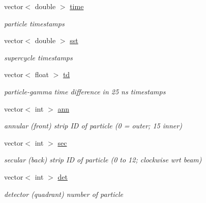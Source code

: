 \begin{DoxyCompactItemize}
\mbox{\label{classg__clx_a5c07b4406a965d58f0e89bb9da646e16}} 
vector$<$ double $>$ \hyperlink{classg__clx_a5c07b4406a965d58f0e89bb9da646e16}{time}
\begin{DoxyCompactList}\small\item\em particle timestamps \end{DoxyCompactList}\item 
\mbox{\label{classg__clx_af07a6345ceec1ac6ffad91105eb7a3a1}} 
vector$<$ double $>$ \hyperlink{classg__clx_af07a6345ceec1ac6ffad91105eb7a3a1}{sst}
\begin{DoxyCompactList}\small\item\em supercycle timestamps \end{DoxyCompactList}\item 
\mbox{\label{classg__clx_a911b31884177102bccf5952da7f48dd4}} 
vector$<$ float $>$ \hyperlink{classg__clx_a911b31884177102bccf5952da7f48dd4}{td}
\begin{DoxyCompactList}\small\item\em particle-\/gamma time difference in 25 ns timestamps \end{DoxyCompactList}\item 
\mbox{\label{classg__clx_aee13b4fa623edc09be528a37667eab1d}} 
vector$<$ int $>$ \hyperlink{classg__clx_aee13b4fa623edc09be528a37667eab1d}{ann}
\begin{DoxyCompactList}\small\item\em annular (front) strip ID of particle (0 = outer; 15 inner) \end{DoxyCompactList}\item 
\mbox{\label{classg__clx_a4803632898349130e80e0237f8b0e1b0}} 
vector$<$ int $>$ \hyperlink{classg__clx_a4803632898349130e80e0237f8b0e1b0}{sec}
\begin{DoxyCompactList}\small\item\em secular (back) strip ID of particle (0 to 12; clockwise wrt beam) \end{DoxyCompactList}\item 
\mbox{\label{classg__clx_a3c2bccdff4a041cf81601d90cc9dda0d}} 
vector$<$ int $>$ \hyperlink{classg__clx_a3c2bccdff4a041cf81601d90cc9dda0d}{det}
\begin{DoxyCompactList}\small\item\em detector (quadrant) number of particle \end{DoxyCompactList}\item 

\end{DoxyCompactItemize}

